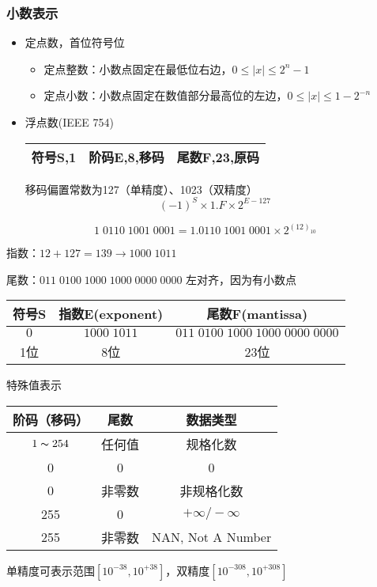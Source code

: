 \subsubsection{小数表示}
\begin{itemize}
\item 定点数，首位符号位
\begin{itemize}
	\item 定点整数：小数点固定在最低位右边，$0\leq|x|\leq 2^n-1$
	\item 定点小数：小数点固定在数值部分最高位的左边，$0\leq|x|\leq 1-2^{-n}$
\end{itemize}
\item 浮点数(IEEE 754)
\begin{center}
\begin{tabular}{|c|c|c|}\hline
符号S,1 & 阶码E,8,移码 & 尾数F,23,原码
\\\hline
\end{tabular}
\end{center}
移码偏置常数为127（单精度）、1023（双精度）
\[(-1)^S\times1.F\times 2^{E-127}\]
\end{itemize}
\begin{example}
\[1\;0110\;1001\;0001=1.0110\;1001\;0001\times 2^{(12)_{10}}\]
\par 指数：$12+127=139\to 1000\;1011$
\par 尾数：$011\;0100\;1000\;1000\;0000\;0000$ 左对齐，因为有小数点
\begin{center}
\begin{tabular}[htbp]{|c|c|c|}
\hline
符号S & 指数E(exponent) & 尾数F(mantissa)\\\hline
$0$ & $1000\;1011$ & $011\;0100\;1000\;1000\;0000\;0000$\\\hline
1位 & 8位 & 23位\\\hline
\end{tabular}
\end{center}
\end{example}
特殊值表示
\begin{center}
\begin{tabular}{ccc}
阶码（移码） & 尾数 & 数据类型\\\hline
$1\thicksim 254$ & 任何值 & 规格化数\\
0 & 0 & 0\\
0 & 非零数 & 非规格化数\\
255 & 0 & $+\infty/-\infty$\\
255 & 非零数 & NAN, Not A Number
\end{tabular}
\end{center}
单精度可表示范围$[10^{-38},10^{+38}]$，双精度$[10^{-308},10^{+308}]$

